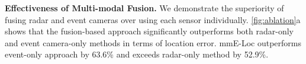 \textbf{Effectiveness of Multi-modal Fusion.}
We demonstrate the superiority of fusing radar and event cameras over using each sensor individually. 
\fig \ref{fig:ablation}a shows that the fusion-based approach significantly outperforms both radar-only and event camera-only methods in terms of location error. 
mmE-Loc outperforms event-only approach by 63.6\% and exceeds radar-only method by 52.9\%.

